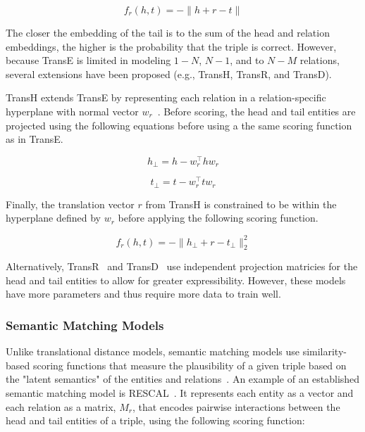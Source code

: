 \begin{equation}\label{eq:trans_e_scoring_function}
    f_r(h,t) = - \|h + r - t\|
\end{equation}

The closer the embedding of the tail is to the sum of the head and relation embeddings, the higher is the probability that the triple is correct.
However, because TransE is limited in modeling $1-N$, $N-1$, and to $N-M$ relations, several extensions have been proposed (e.g., TransH, TransR, and TransD).

TransH extends TransE by representing each relation in a relation-specific hyperplane with normal vector $w_r$~\cite{Wang2014}.
Before scoring, the head and tail entities are projected using the following equations before using a the same scoring function as in TransE.

\begin{equation} \label{eq:trans_h_proj_head}
h_{\perp} = h -w_{r}^\top hw_r
\end{equation}

\begin{equation} \label{eq:trans_h_proj_tail}
t_{\perp} = t -w_{r}^\top tw_r
\end{equation}

Finally, the translation vector $r$ from TransH is constrained to be within the hyperplane defined by $w_r$ before applying the following scoring function.

\begin{equation} \label{eq:trans_h_scoring_function}
    f_r(h,t) = -\|h_{\perp} + r - t_{\perp}\|_{2}^2
\end{equation}

Alternatively, TransR~\cite{Lin2015} and TransD~\cite{Ji2015} use independent projection matricies for the head and tail entities to allow for greater expressibility.
However, these models have more parameters and thus require more data to train well.

\subsubsection{Semantic Matching Models}

Unlike translational distance models, semantic matching models use similarity-based scoring functions that measure the plausibility of a given triple based on the "latent semantics" of the entities and relations~\cite{Wang2017}.
An example of an established semantic matching model is RESCAL~\cite{Nickel2011}.
It represents each entity as a vector and each relation as a matrix, $M_r$, that encodes pairwise interactions between the head and tail entities of a triple, using the following scoring function:

